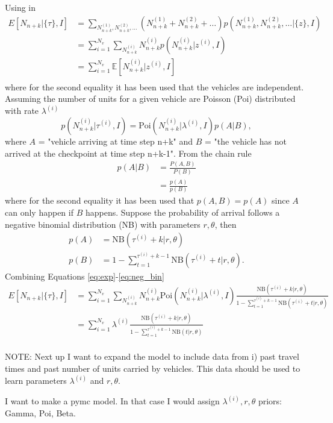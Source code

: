Using  in 
\begin{equation}
	\begin{split}
		E[N_{n+k} |\{\tau\},I] &= \sum_{N_{n+k}^{(1)},N_{n+k}^{(2)},\dots}(N_{n+k}^{(1)}+N_{n+k}^{(2)}+\dots)p(N_{n+k}^{(1)},N_{n+k}^{(2)},\dots|\{z\},I)\\
		&=\sum_{i=1}^{N_v}\sum_{N_{n+k}^{(i)}} N_{n+k}^{(i)}p(N_{n+k}^{(i)}|z^{(i)},I)\\
		&=\sum_{i=1}^{N_v}\mathbb{E}[N_{n+k}^{(i)}|z^{(i)},I]\\
	\end{split}
	\label{eq:exp}
\end{equation}
where for the second equality it has been used that the vehicles are independent. Assuming the number of units for a given vehicle are Poisson (Poi) distributed with rate $\lambda^{(i)}$ 
\begin{equation}
	p(N_{n+k}^{(i)}|\tau^{(i)},I) = \text{Poi}(N_{n+k}^{(i)}|\lambda^{(i)},I)p(A|B),
	\label{eq:poi}
\end{equation}
where $A$ = "vehicle arriving at time step n+k" and $B$ = "the vehicle has not arrived at the checkpoint at time step n+k-1". From the chain rule
\begin{equation}
	\begin{split}
		p(A|B) &= \frac{P(A,B)}{P(B)}\\
		&= \frac{p(A)}{p(B)}
	\end{split}
	\label{eq:chain}
\end{equation}
where for the second equality it has been used that $p(A,B)=p(A)$ since $A$ can only happen if $B$ happens. Suppose the probability of arrival follows a negative binomial distribution (NB) with parameters $r, \theta$, then
\begin{equation}
	\begin{split}
		p(A) &= \text{NB}(\tau^{(i)}+k|r,\theta)\\
		p(B)& = 1-\sum_{t=1}^{\tau^{(i)}+k-1}\text{NB}(\tau^{(i)}+t|r,\theta).
	\end{split}
	\label{eq:neg_bin}
\end{equation}
Combining Equations \eqref{eq:exp}-\eqref{eq:neg_bin}
\begin{equation}
	\begin{split}
		E[N_{n+k} |\{\tau\},I] &=\sum_{i=1}^{N_v}\sum_{N_{n+k}^{(i)}} N_{n+k}^{(i)}\text{Poi}(N_{n+k}^{(i)}|\lambda^{(i)},I)\frac{\text{NB}(\tau^{(i)}+k|r,\theta)}{1-\sum_{t=1}^{\tau^{(i)}+k-1}\text{NB}(\tau^{(i)}+t|r,\theta)}\\
		&=\sum_{i=1}^{N_v}\lambda^{(i)}\frac{\text{NB}(\tau^{(i)}+k|r,\theta)}{1-\sum_{t=1}^{\tau^{(i)}+k-1}\text{NB}(t|r,\theta)}\\
	\end{split}
\end{equation}


NOTE: Next up I want to expand the model to include data from i) past travel times and past number of units carried by vehicles. This data should be used to learn parameters $\lambda^{(i)}$ and $r,\theta$.

I want to make a pymc model. In that case I would assign $\lambda^{(i)},r,\theta$ priors: Gamma,  Poi, Beta.